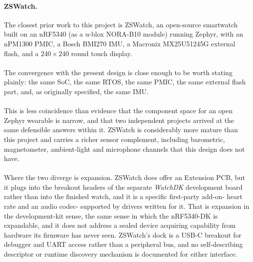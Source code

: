 \documentclass[12pt, a4paper]{article}
\begin{document}
\paragraph{ZSWatch.}
\label{lit:zswatch}
The closest prior work to this project is ZSWatch, an open-source smartwatch
built on an nRF5340 (as a u-blox NORA-B10 module) running Zephyr, with an
nPM1300 PMIC, a Bosch BMI270 IMU, a Macronix MX25U51245G external flash, and a
$240\times240$ round touch display.\\\\
The convergence with the present design is close enough to be worth stating
plainly: the same SoC, the same RTOS, the same PMIC, the same external flash
part, and, as originally specified, the same IMU.\\\\
This is less coincidence than evidence that the component space for an open Zephyr wearable is narrow, and
that two independent projects arrived at the same defensible answers within it.
ZSWatch is considerably more mature than this project and carries a richer
sensor complement, including barometric, magnetometer, ambient-light and
microphone channels that this design does not have.\\\\
Where the two diverge is expansion. ZSWatch does offer an Extension PCB, but it
plugs into the breakout headers of the separate \emph{WatchDK} development
board rather than into the finished watch, and it is a specific first-party
add-on- heart rate and an audio codec- supported by drivers written for it.
That is expansion in the development-kit sense, the same sense in which the
nRF5340-DK is expandable, and it does not address a sealed device acquiring
capability from hardware its firmware has never seen. ZSWatch's dock is a USB-C
breakout for debugger and UART access rather than a peripheral bus, and no
self-describing descriptor or runtime discovery mechanism is documented for
either interface.
\end{document}
